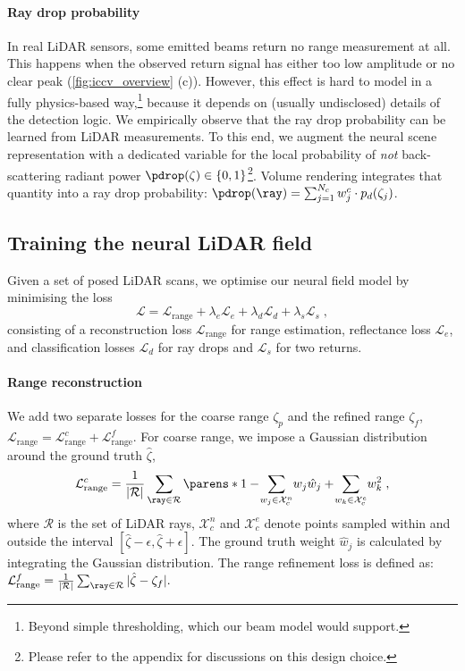 \paragraph{Ray drop probability}
In real LiDAR sensors, some emitted beams return no range measurement at all. This happens when the observed return signal has either too low amplitude or no clear peak (\cref{fig:iccv_overview} (c)). However, this effect is hard to model in a fully physics-based way,\footnote{Beyond simple thresholding, which our beam model would support.} because it depends on (usually undisclosed) details of the detection logic. We empirically observe that the ray drop probability can be learned from LiDAR measurements. To this end, we augment the neural scene representation with a dedicated variable for the local probability of \textit{not} back-scattering radiant power $\pdrop(\zeta) \in \{0, 1\}$\footnote{Please refer to the appendix for discussions on this design choice.}. 
Volume rendering integrates that quantity into a ray drop probability: $\pdrop(\ray) = \sum_{j=1}^{N_c} w_j^c\cdot p_d(\zeta_j)$.


\subsection{Training the neural LiDAR field}
\label{sec:opt}
Given a set of posed LiDAR scans, we optimise our neural field model by minimising the loss
\begin{equation}
    \mathcal{L} = \mathcal{L}_{\text{range}} + \lambda_e \mathcal{L}_{e} + \lambda_d \mathcal{L}_{d} + \lambda_s\mathcal{L}_s\;,
\label{eq:iccv_loss}
\end{equation}
consisting of a reconstruction loss $\mathcal{L}_{\text{range}}$ for range estimation, reflectance loss $\mathcal{L}_{e}$, and classification losses $\mathcal{L}_{d}$ for ray drops and $\mathcal{L}_s$ for two returns. 


\paragraph{Range reconstruction}
We add two separate losses for the coarse range $\zeta_p$ and the refined range $\zeta_f$, $\mathcal{L}_{\text{range}} = \mathcal{L}_{\text{range}}^c + \mathcal{L}_{\text{range}}^f$. For coarse range, we impose a Gaussian distribution~\cite{rematas2021urban} around the ground truth $\hat{\zeta}$, 
\begin{equation}
    \mathcal{L}_{\text{range}}^c = \frac{1}{|\mathcal{R}|} \sum_{\ray \in \mathcal{R}} \parens*{1-\!\sum_{w_j \in \mathcal{X}_c^n}\!w_j \hat{w}_j+\!\sum_{w_k \in \mathcal{X}_c^e}\!w_k^2}\;,
\end{equation}
where $\mathcal{R}$ is the set of LiDAR rays, $\mathcal{X}_c^n$ and $\mathcal{X}_c^e$ denote points sampled within and outside the interval $[\hat{\zeta}-\epsilon,\hat{\zeta}+\epsilon]$. The ground truth weight $\hat{w}_j$ is calculated by integrating the Gaussian distribution.
The range refinement loss is defined as: $\mathcal{L}_{\text{range}}^f = \frac{1}{|\mathcal{R}|} \sum_{\ray \in \mathcal{R}} |\hat{\zeta} - \zeta_f|.$


